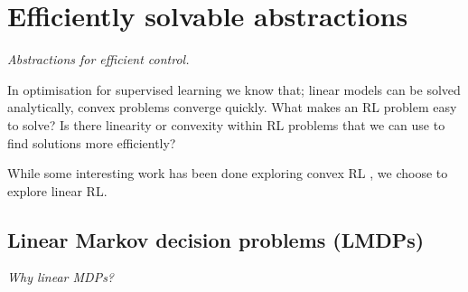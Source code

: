 \newpage
\section{Efficiently solvable abstractions}\label{solveable-abstractions}

\begin{displayquote}
  \textsl{Abstractions for efficient control.}
\end{displayquote}


In optimisation for supervised learning we know that;
linear models can be solved analytically, convex problems converge quickly.
What makes an RL problem easy to solve? Is there linearity or convexity
within RL problems that we can use to find solutions more efficiently?


While some interesting work has been done exploring convex RL \cite{ODonoghue2012a, Barratt2019},
we choose to explore linear RL.

\subsection{Linear Markov decision problems (LMDPs)}

\begin{displayquote}
\textsl{Why linear MDPs?}
\end{displayquote}


%


